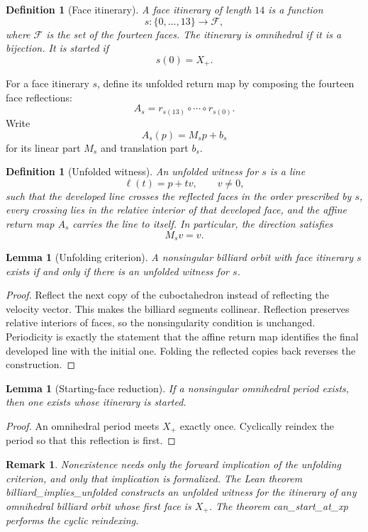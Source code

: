 \documentclass[11pt]{article}
\newtheorem{lemma}[theorem]{Lemma}
\newtheorem{definition}[theorem]{Definition}
\newtheorem{remark}[theorem]{Remark}
\newcommand{\F}{\mathcal F}
\newcommand{\leanref}[1]{{\small\ttfamily #1}}
\begin{document}
\begin{definition}[Face itinerary]
A \emph{face itinerary} of length \(14\) is a function
\[
  s:\{0,\ldots,13\}\to\F,
\]
where \(\F\) is the set of the fourteen faces.  The itinerary is
\emph{omnihedral} if it is a bijection.  It is \emph{started} if
\[
  s(0)=X_+.
\]
\end{definition}

For a face itinerary \(s\), define its unfolded return map by composing the
fourteen face reflections:
\[
  A_s=r_{s(13)}\circ\cdots\circ r_{s(0)}.
\]
Write
\[
  A_s(p)=M_sp+b_s
\]
for its linear part \(M_s\) and translation part \(b_s\).

\begin{definition}[Unfolded witness]
An \emph{unfolded witness} for \(s\) is a line
\[
  \ell(t)=p+tv,\qquad v\ne0,
\]
such that the developed line crosses the reflected faces in the order
prescribed by \(s\), every crossing lies in the relative interior of that
developed face, and the affine return map \(A_s\) carries the line to itself.
In particular, the direction satisfies
\[
  M_sv=v.
\]
\end{definition}

\begin{lemma}[Unfolding criterion]
A nonsingular billiard orbit with face itinerary \(s\) exists if and only if
there is an unfolded witness for \(s\).
\end{lemma}

\begin{proof}
Reflect the next copy of the cuboctahedron instead of reflecting the velocity
vector.  This makes the billiard segments collinear.  Reflection preserves
relative interiors of faces, so the nonsingularity condition is unchanged.
Periodicity is exactly the statement that the affine return map identifies
the final developed line with the initial one.  Folding the reflected copies
back reverses the construction.
\end{proof}

\begin{lemma}[Starting-face reduction]
If a nonsingular omnihedral period exists, then one exists whose itinerary is
started.
\end{lemma}

\begin{proof}
An omnihedral period meets \(X_+\) exactly once.  Cyclically reindex the
period so that this reflection is first.
\end{proof}

\begin{remark}
Nonexistence needs only the forward implication of the unfolding criterion,
and only that implication is formalized.  The Lean theorem
\leanref{billiard\_implies\_unfolded} constructs an unfolded witness for the
itinerary of any omnihedral billiard orbit whose first face is \(X_+\).  The
theorem \leanref{can\_start\_at\_xp} performs the cyclic reindexing.
\end{remark}
\end{document}
